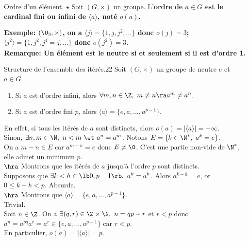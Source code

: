 \documentclass[11pt]{article}
\begin{document}
\vspace*{-0.8cm}

\begin{defi}{Ordre d'un élément. $\star$}{}
    Soit $(G,\times)$ un groupe. L'\bf{ordre} de $a\in G$ est le cardinal fini ou infini de $\langle a\rangle $, noté $o(a)$.
\end{defi}

\vspace*{-0.8cm}

\bf{Exemple:} $(\U_3,\times)$, on a $\langle j\rangle=\{1,j,j^2,...\}$ donc $o(j)=3$; $\langle j^2 \rangle=\{1,j^2,j^4=j,...\}$ donc $o(j^2)=3$.\\
\bf{Remarque:} Un élément est le neutre si et seulement si il est d'ordre 1.

\begin{thm}{Structure de l'ensemble des itérés.}{22}
    Soit $(G,\times)$ un groupe de neutre $e$ et $a\in G$.
    \begin{enumerate}
        \item Si $a$ est d'ordre infini, alors $\forall m,n\in\Z, ~ m\neq n \ra a^m \neq a^n$.
        \item Si $a$ est d'ordre fini $p$, alors $\langle a \rangle = \{e,a,...,a^{p-1}\}$.
    \end{enumerate}
    \tcblower
     En effet, si tous les itérés de $a$ sont distincts, alors $o(a)=|\langle a\rangle|=+\infty$.\\
     Sinon, $\exists n,m\in\N, ~ n<m ~\et~ a^n=a^m$. Notons $E=\{k\in\N^*,~a^k=e\}$.\\
    On a $m-n\in E$ car $a^{m-n}=e$ donc $E\neq\0$. C'est une partie non-vide de $\N^*$, elle admet un minimum $p$.\\
    $\hra$ Montrons que les itérés de $a$ jusqu'à l'ordre $p$ sont distincts.\\
    \hspace*{0.3cm}Supposons que $\exists k<h \in \lb0,p-1\rb, ~ a^k=a^h$. Alors $a^{k-h}=e$, or $0\leq k-h<p$. Absurde.\\
    $\hra$ Montrons que $\langle a \rangle = \{e,a,...,a^{p-1}\}$.\\
    \boxed{\supset} Trivial.\\
    \boxed{\subset} Soit $n\in\Z$. On a $\exists (q,r)\in\Z\times\N, ~ n=qp+r$ et $r<p$ donc $a^n=a^{pq}a^r=a^r\in\{e,a,...,a^{p-1}\}$ car $r<p$.\\
    En particulier, $o(a)=|\langle a \rangle|=p$.
\end{thm}
\end{document}
